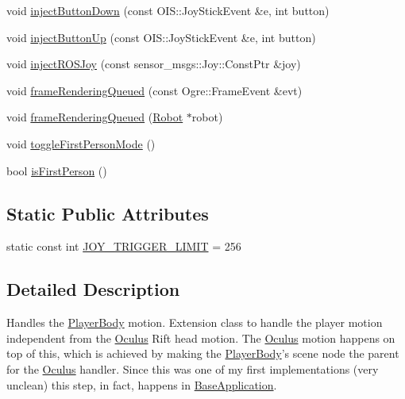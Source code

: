 \begin{DoxyCompactItemize}
\item 
void \hyperlink{classPlayerBody_a4232ab059277ab6258f0efa8ea38e6a6}{inject\-Button\-Down} (const \-O\-I\-S\-::\-Joy\-Stick\-Event \&e, int button)
\item 
void \hyperlink{classPlayerBody_a70d896fc815d013934f144d6d3c18c9a}{inject\-Button\-Up} (const \-O\-I\-S\-::\-Joy\-Stick\-Event \&e, int button)
\item 
void \hyperlink{classPlayerBody_ac8085b6f1a32beb188d198cec800bfff}{inject\-R\-O\-S\-Joy} (const sensor\-\_\-msgs\-::\-Joy\-::\-Const\-Ptr \&joy)
\item 
void \hyperlink{classPlayerBody_abc2ddad0523749a1c331e781bc45b810}{frame\-Rendering\-Queued} (const \-Ogre\-::\-Frame\-Event \&evt)
\item 
void \hyperlink{classPlayerBody_a27acbaf54e05dc302ace0c5482a4b6d2}{frame\-Rendering\-Queued} (\hyperlink{classRobot}{\-Robot} $\ast$robot)
\item 
void \hyperlink{classPlayerBody_a00e5cc5360085f4e11227047faf62f6a}{toggle\-First\-Person\-Mode} ()
\item 
bool \hyperlink{classPlayerBody_ac7be2d15c10f7619e5fca44ce40aa814}{is\-First\-Person} ()
\end{DoxyCompactItemize}
\subsection*{\-Static \-Public \-Attributes}
\begin{DoxyCompactItemize}
\item 
static const int \hyperlink{classPlayerBody_a82eef395a2ecbc593ffcb074178dbf69}{\-J\-O\-Y\-\_\-\-T\-R\-I\-G\-G\-E\-R\-\_\-\-L\-I\-M\-I\-T} = 256
\end{DoxyCompactItemize}


\subsection{\-Detailed \-Description}
\-Handles the \hyperlink{classPlayerBody}{\-Player\-Body} motion. \-Extension class to handle the player motion independent from the \hyperlink{classOculus}{\-Oculus} \-Rift head motion. \-The \hyperlink{classOculus}{\-Oculus} motion happens on top of this, which is achieved by making the \hyperlink{classPlayerBody}{\-Player\-Body}'s scene node the parent for the \hyperlink{classOculus}{\-Oculus} handler. \-Since this was one of my first implementations (very unclean) this step, in fact, happens in \hyperlink{classBaseApplication}{\-Base\-Application}. 

